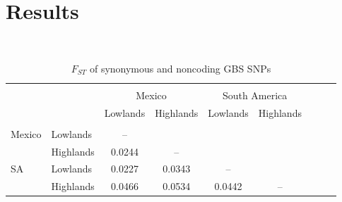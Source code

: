 \section*{Results}

\renewcommand{\arraystretch}{1.1}
\begin{table}[tb]

\begin{center}
 \caption[]{$F_{ST}$ of synonymous and noncoding GBS SNPs}
  \textbf{}\\[-2mm]
{\fontsize{7}{9}\sf
    \begin{tabular}{llccccccl}
    \hline
    & & \\[-3mm]
	&		&	\multicolumn{2}{c}{Mexico}		&	\multicolumn{2}{c}{South America}		\\
	&		&	Lowlands	&	Highlands	&	Lowlands	&	Highlands	\\
      \hline
    & & \\[-3mm]
Mexico	&	Lowlands	&	--		&			&			&		\\
		&	Highlands	&	0.0244	&	--		&			&		\\
SA		&	Lowlands	&	0.0227	&	0.0343	&	--		&		\\
		&	Highlands	&	0.0466	&	0.0534	&	0.0442	&	--	\\ [1mm]
    \hline
    \end{tabular}
    \label{FstP}  %
}
\end{center}
\end{table}
\renewcommand{\arraystretch}{1}

